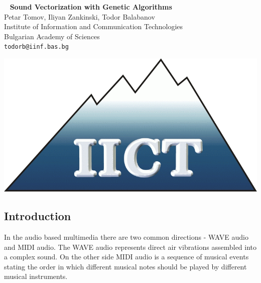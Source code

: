 \documentclass[a0,portrait,25pt]{sciposter}
\begin{document}
\pagecolor{LightGray}

\begin{mdframed}[backgroundcolor=white,roundcorner=4pt,shadow=true,linewidth=1pt]
\begin{minipage}[b]{1.44  \linewidth}
\begin{multicols}{2}
\
\color{DimGray}
\Huge \textbf{Sound Vectorization with Genetic Algorithms} \\
\huge {Petar Tomov, Iliyan Zankinski, Todor Balabanov} \\ [0.5cm] 
\huge Institute of Information and Communication Technologies \\  Bulgarian Academy of Sciences \\ [0.4cm]
\Large \texttt{todorb@iinf.bas.bg}

\includegraphics[width=20cm]{logo-iict-en}
\end{multicols}
\end{minipage}
\end{mdframed}

\vspace{0.5cm}

\begin{mdframed}[backgroundcolor=white,roundcorner=4pt,shadow=true,linewidth=1pt]
\color{Black}
\section*{Introduction}
In the audio based multimedia there are two common directions - WAVE audio and MIDI audio. The WAVE audio represents direct air vibrations assembled into a complex sound. On the other side MIDI audio is a sequence of musical events stating the order in which different musical notes should be played by different musical instruments. 
\end{mdframed}
\end{document}
